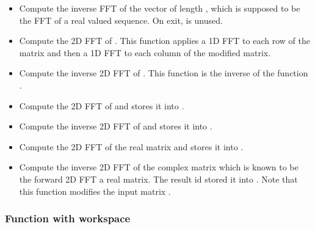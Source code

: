 \begin{itemize}
\item {}
  \sshortdescribe Compute the inverse FFT of the vector  of
  length , which is supposed to be the FFT of a real valued
  sequence. On exit,  is unused.
\item {}
  \sshortdescribe Compute the 2D FFT of . This function applies a 1D
  FFT to each row of the matrix and then a 1D FFT to each column of the modified
  matrix.
\item {}
  \sshortdescribe Compute the inverse 2D FFT of . This function is
  the inverse of the function .
\item {}
  \sshortdescribe Compute the 2D FFT of  and stores it into .
\item {}
  \sshortdescribe Compute the inverse 2D FFT of  and stores it into .
\item {}
  \sshortdescribe Compute the 2D FFT of the real matrix  and stores it into .
\item {}
  \sshortdescribe Compute the inverse 2D FFT of the complex matrix 
  which is known to be the forward 2D FFT a real matrix. The result id stored it
  into . Note that this function modifies the input matrix .
\end{itemize}

\subsubsection{Function with workspace}
\label{sec:fft-workspace}

